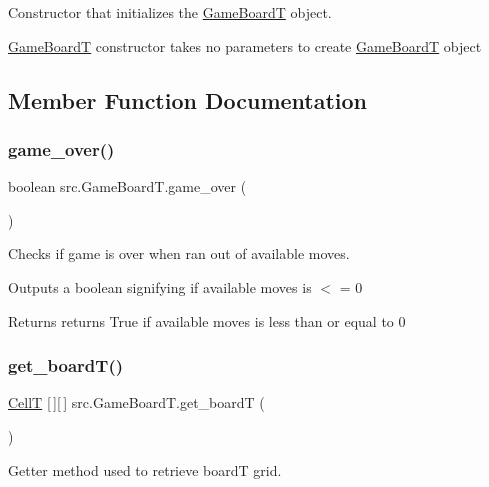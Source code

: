 Constructor that initializes the \hyperlink{classsrc_1_1GameBoardT}{Game\+BoardT} object. 

\hyperlink{classsrc_1_1GameBoardT}{Game\+BoardT} constructor takes no parameters to create \hyperlink{classsrc_1_1GameBoardT}{Game\+BoardT} object 

\subsection{Member Function Documentation}
\mbox{\label{classsrc_1_1GameBoardT_aae78025d300e5ea77bf417e02f83156f}} 
\subsubsection{\texorpdfstring{game\+\_\+over()}{game\_over()}}
{\footnotesize\ttfamily boolean src.\+Game\+Board\+T.\+game\+\_\+over (\begin{DoxyParamCaption}{ }\end{DoxyParamCaption})}



Checks if game is over when ran out of available moves. 

Outputs a boolean signifying if available moves is $<$ = 0 \begin{DoxyReturn}{Returns}
returns True if available moves is less than or equal to 0 
\end{DoxyReturn}
\mbox{\label{classsrc_1_1GameBoardT_ab6addd1e5e0c4575676034c9c59ff285}} 
\subsubsection{\texorpdfstring{get\+\_\+board\+T()}{get\_boardT()}}
{\footnotesize\ttfamily \hyperlink{enumsrc_1_1CellT}{CellT} \mbox{[}$\,$\mbox{]}\mbox{[}$\,$\mbox{]} src.\+Game\+Board\+T.\+get\+\_\+boardT (\begin{DoxyParamCaption}{ }\end{DoxyParamCaption})}



Getter method used to retrieve boardT grid. 

